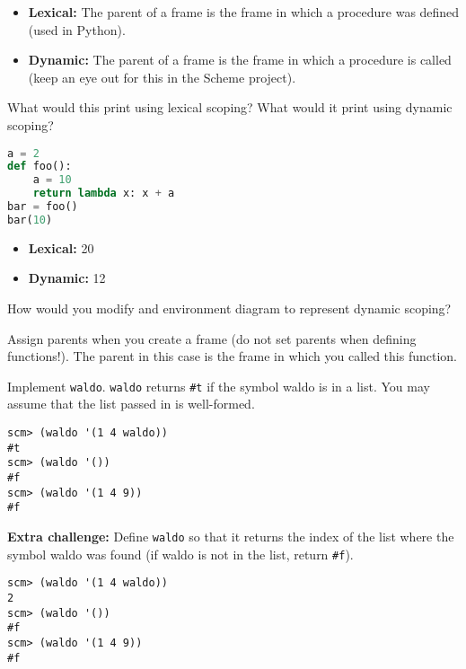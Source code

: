 \documentclass{exam}
\begin{document}
\begin{questions}
\begin{blocksection}
\begin{solution}[0.5in]
\begin{itemize}
    \item \textbf{Lexical:} The parent of a frame is the frame in which a
        procedure was defined (used in Python).
    \item \textbf{Dynamic:} The parent of a frame is the frame in which a
        procedure is called (keep an eye out for this in the Scheme project).
\end{itemize}
\end{solution}
\end{blocksection}

\begin{blocksection}
\question What would this print using lexical scoping? What would it print using
dynamic scoping?

\begin{lstlisting}[language=Python]
a = 2
def foo():
    a = 10
    return lambda x: x + a
bar = foo()
bar(10)
\end{lstlisting}
\begin{solution}[0.25in]
\begin{itemize}
    \item \textbf{Lexical:} 20
    \item \textbf{Dynamic:} 12
\end{itemize}
\end{solution}

\end{blocksection}

\begin{blocksection}
\question How would you modify and environment diagram to represent dynamic
scoping?

\begin{solution}[0.5in]
Assign parents when you create a frame (do not set parents when defining
functions!). The parent in this case is the frame in which you called this
function.
\end{solution}

\end{blocksection}

\begin{blocksection}
\question Implement \texttt{waldo}. \texttt{waldo} returns \texttt{\#t} if the
symbol waldo is in a list. You may assume that the list passed in is
well-formed.\\

\begin{lstlisting}
scm> (waldo '(1 4 waldo))
#t
scm> (waldo '())
#f
scm> (waldo '(1 4 9))
#f
\end{lstlisting}
\textbf{Extra challenge:} Define \texttt{waldo} so that it returns the index of
the list where the symbol waldo was found (if waldo is not in the list, return
\texttt{\#f}).
\begin{lstlisting}
scm> (waldo '(1 4 waldo))
2
scm> (waldo '())
#f
scm> (waldo '(1 4 9))
#f
\end{lstlisting}


\end{blocksection}
\end{questions}
\end{document}
